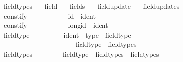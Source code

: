 \begin{isabellebody}
\ \ field{\isacharunderscore}{\kern0pt}types\ \isanewline
\ \ field\ \isanewline
\ \ fields\ \isanewline
\ \ field{\isacharunderscore}{\kern0pt}update\ \isanewline
\ \ field{\isacharunderscore}{\kern0pt}updates\isanewline
\isanewline
{}\isamarkupfalse%
\isanewline
\ \ {\isachardoublequoteopen}{\isacharunderscore}{\kern0pt}constify{\isachardoublequoteclose}\ \ \ \ \ \ \ \ \ \ \ {\isacharcolon}{\kern0pt}{\isacharcolon}{\kern0pt}\ {\isachardoublequoteopen}id\ {\isacharequal}{\kern0pt}{\isachargreater}{\kern0pt}\ ident{\isachardoublequoteclose}\ \ \ \ \ \ \ \ \ \ \ \ \ \ \ \ \ \ \ \ \ \ \ \ {\isacharparenleft}{\kern0pt}{\isachardoublequoteopen}{\isacharunderscore}{\kern0pt}{\isachardoublequoteclose}{\isacharparenright}{\kern0pt}\isanewline
\ \ {\isachardoublequoteopen}{\isacharunderscore}{\kern0pt}constify{\isachardoublequoteclose}\ \ \ \ \ \ \ \ \ \ \ {\isacharcolon}{\kern0pt}{\isacharcolon}{\kern0pt}\ {\isachardoublequoteopen}longid\ {\isacharequal}{\kern0pt}{\isachargreater}{\kern0pt}\ ident{\isachardoublequoteclose}\ \ \ \ \ \ \ \ \ \ \ \ \ \ \ \ \ \ \ \ {\isacharparenleft}{\kern0pt}{\isachardoublequoteopen}{\isacharunderscore}{\kern0pt}{\isachardoublequoteclose}{\isacharparenright}{\kern0pt}\isanewline
\isanewline
\ \ {\isachardoublequoteopen}{\isacharunderscore}{\kern0pt}field{\isacharunderscore}{\kern0pt}type{\isachardoublequoteclose}\ \ \ \ \ \ \ \ \ {\isacharcolon}{\kern0pt}{\isacharcolon}{\kern0pt}\ {\isachardoublequoteopen}ident\ {\isacharequal}{\kern0pt}{\isachargreater}{\kern0pt}\ type\ {\isacharequal}{\kern0pt}{\isachargreater}{\kern0pt}\ field{\isacharunderscore}{\kern0pt}type{\isachardoublequoteclose}\ \ \ \ \ \ \ \ {\isacharparenleft}{\kern0pt}{\isachardoublequoteopen}{\isacharparenleft}{\kern0pt}{}{\isacharunderscore}{\kern0pt}\ {\isacharcolon}{\kern0pt}{\isacharcolon}{\kern0pt}{\isacharslash}{\kern0pt}\ {\isacharunderscore}{\kern0pt}{\isacharparenright}{\kern0pt}{\isachardoublequoteclose}{\isacharparenright}{\kern0pt}\isanewline
\ \ {\isachardoublequoteopen}{\isachardoublequoteclose}\ \ \ \ \ \ \ \ \ \ \ \ \ \ \ \ \ \ \ \ {\isacharcolon}{\kern0pt}{\isacharcolon}{\kern0pt}\ {\isachardoublequoteopen}field{\isacharunderscore}{\kern0pt}type\ {\isacharequal}{\kern0pt}{\isachargreater}{\kern0pt}\ field{\isacharunderscore}{\kern0pt}types{\isachardoublequoteclose}\ \ \ \ \ \ \ \ \ \ {\isacharparenleft}{\kern0pt}{\isachardoublequoteopen}{\isacharunderscore}{\kern0pt}{\isachardoublequoteclose}{\isacharparenright}{\kern0pt}\isanewline
\ \ {\isachardoublequoteopen}{\isacharunderscore}{\kern0pt}field{\isacharunderscore}{\kern0pt}types{\isachardoublequoteclose}\ \ \ \ \ \ \ \ {\isacharcolon}{\kern0pt}{\isacharcolon}{\kern0pt}\ {\isachardoublequoteopen}field{\isacharunderscore}{\kern0pt}type\ {\isacharequal}{\kern0pt}{\isachargreater}{\kern0pt}\ field{\isacharunderscore}{\kern0pt}types\ {\isacharequal}{\kern0pt}{\isachargreater}{\kern0pt}\ field{\isacharunderscore}{\kern0pt}types{\isachardoublequoteclose}\ \ \ \ {\isacharparenleft}{\kern0pt}{\isachardoublequoteopen}{\isacharunderscore}{\kern0pt}{\isacharcomma}{\kern0pt}{\isacharslash}{\kern0pt}\ {\isacharunderscore}{\kern0pt}{\isachardoublequoteclose}{\isacharparenright}{\kern0pt}\isanewline

\end{isabellebody}
